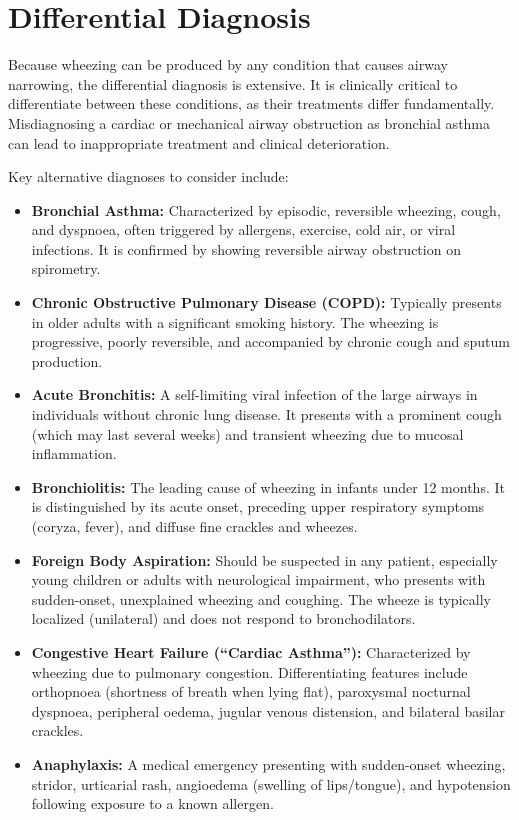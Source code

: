 \section*{Differential Diagnosis}
Because wheezing can be produced by any condition that causes airway narrowing, the differential diagnosis is extensive. It is clinically critical to differentiate between these conditions, as their treatments differ fundamentally. Misdiagnosing a cardiac or mechanical airway obstruction as bronchial asthma can lead to inappropriate treatment and clinical deterioration.

Key alternative diagnoses to consider include:
\begin{itemize}
    \item \textbf{Bronchial Asthma:} Characterized by episodic, reversible wheezing, cough, and dyspnoea, often triggered by allergens, exercise, cold air, or viral infections. It is confirmed by showing reversible airway obstruction on spirometry.
    \item \textbf{Chronic Obstructive Pulmonary Disease (COPD):} Typically presents in older adults with a significant smoking history. The wheezing is progressive, poorly reversible, and accompanied by chronic cough and sputum production.
    \item \textbf{Acute Bronchitis:} A self-limiting viral infection of the large airways in individuals without chronic lung disease. It presents with a prominent cough (which may last several weeks) and transient wheezing due to mucosal inflammation.
    \item \textbf{Bronchiolitis:} The leading cause of wheezing in infants under 12 months. It is distinguished by its acute onset, preceding upper respiratory symptoms (coryza, fever), and diffuse fine crackles and wheezes.
    \item \textbf{Foreign Body Aspiration:} Should be suspected in any patient, especially young children or adults with neurological impairment, who presents with sudden-onset, unexplained wheezing and coughing. The wheeze is typically localized (unilateral) and does not respond to bronchodilators.
    \item \textbf{Congestive Heart Failure (``Cardiac Asthma''):} Characterized by wheezing due to pulmonary congestion. Differentiating features include orthopnoea (shortness of breath when lying flat), paroxysmal nocturnal dyspnoea, peripheral oedema, jugular venous distension, and bilateral basilar crackles.
    \item \textbf{Anaphylaxis:} A medical emergency presenting with sudden-onset wheezing, stridor, urticarial rash, angioedema (swelling of lips/tongue), and hypotension following exposure to a known allergen.

\end{itemize}
